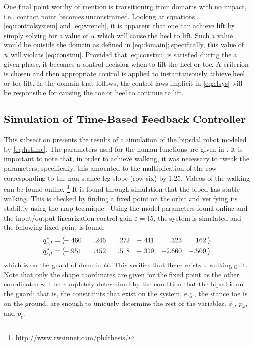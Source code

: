 \begin{remark}
  One final point worthy of mention is transitioning from domains with no
  impact, i.e., contact point becomes unconstrained.
  Looking at equations, \eqref{eq:controlsystem} and \eqref{eq:wrench}, it is
  apparent that one can achieve lift by simply solving for a value of $u$
  which will cause the heel to lift.
  Such a value would be outside the domain as defined in \eqref{eq:domain};
  specifically, this value of $u$ will violate \eqref{eq:constnu}.
  Provided that \eqref{eq:constnu} is satisfied during the a given phase, it
  becomes a control decision when to lift the heel or toe.
  A criterion is chosen and then appropriate control is applied to
  instantaneously achieve heel or toe lift.
  In the domain that follows, the control laws implicit in \eqref{eq:clsys} will
  be responsible for causing the toe or heel to continue to lift.
\end{remark}


\subsection{Simulation of Time-Based Feedback Controller} \label{sec:timesim}

This subsection presents the results of a simulation of the bipedal robot
modeled by \eqref{eq:hstime}.
%
The parameters used for the human functions are given in .
%
It is important to note that, in order to achieve walking, it was necessary to
tweak the parameters;
%
specifically, this amounted to the multiplication of the row corresponding to
the non-stance leg slope (row six) by $1.25$.
%
Videos of the walking can be found online.%
%
\footnote{\url{http://www.rwsinnet.com/phdthesis/}\label{fn:rwsinnet}}\xspace
%
It is found through simulation that the biped has stable walking.
%
This is checked by finding a fixed point on the orbit and verifying its
stability using the \Poincare{} map technique \cite{Parker1989}.
%
Using the model parameters found online and the
input/output linearization control gain $\varepsilon = 15$, the system is
simulated and the following fixed point is found:
%
\begin{align}
  q_{s,t}^{*} =
  \left(\!\!\!\!\begin{array}{c c c c c c}
    -.460 & \hphantom{-}.246 & \hphantom{-}.272 & -.441 & \hphantom{-0}.323 &
    \hphantom{-}.162
  \end{array}\!\!\right)\\
  {\dot q}_{s,t}^{*} =
  \left(\!\!\!\!\begin{array}{c c c c c c}
    -.951 & \hphantom{-}.452 & \hphantom{-}.518 & -.309 & -2.660 & -.509
  \end{array}\!\!\right)
\end{align}
which is on the guard of domain $\mathit{hl}$.
%
This verifies that there exists a walking gait.
%
Note that only the shape coordinates are given for the fixed point as the other
coordinates will be completely determined by the condition that the biped is on
the guard;
%
that is, the constraints that exist on the system, e.g., the stance toe is on
the ground, are enough to uniquely determine the rest of the variables,
$\phi_b$, $p_x$, and $p_z$.

